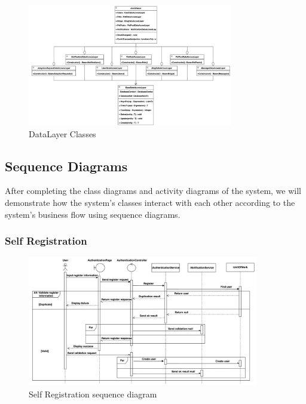 \begin{figure}[H]
  \centering
  \includegraphics[angle=-90,width=0.8\textwidth]{Figures/uow_class.png}
  \caption{DataLayer Classes}
  \label{fig:datalayer-classes}
\end{figure}
\clearpage

\subsection{Sequence Diagrams}

After completing the class diagrams and activity diagrams of the system, we will  demonstrate how the system's classes interact with each other according to the system's business flow using sequence diagrams.

\subsubsection{Self Registration}

\begin{figure}[H]
  \centering
  \includegraphics[width=0.9\textwidth]{Figures/self_register_seq.png}
  \caption{Self Registration sequence diagram}
  \label{fig:self-registration-seq}
\end{figure}


